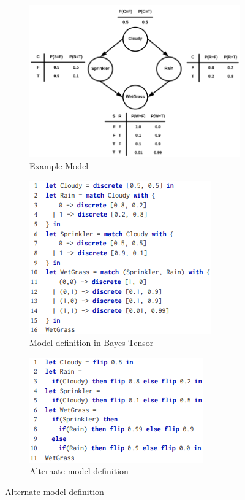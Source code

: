 \documentclass{beamer}
\begin{document}
\begin{frame}
	\frametitle{}
	\begin{figure}
		\begin{subfigure}{0.5 \textwidth}
			\centering
			\includegraphics[scale=0.4]{imgs/example_model.png}
			\caption{Example Model}
		\end{subfigure}%
		\begin{subfigure}{0.5 \textwidth}
			\centering
			\includegraphics[scale=0.4]{imgs/example_code.png}
			\caption{Model definition in Bayes Tensor}
		\end{subfigure}
		\begin{subfigure}{0.5 \textwidth}
			\centering
			\includegraphics[scale=0.4]{imgs/example_code2.png}
			\caption{Alternate model definition}
		\end{subfigure}%

\end{figure}
\end{frame}
\end{document}
